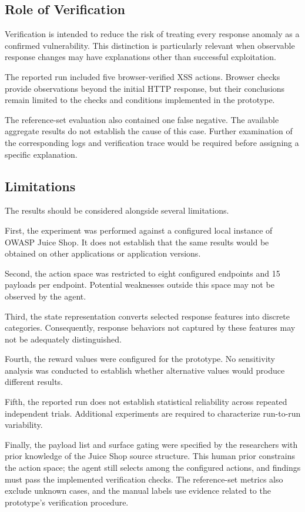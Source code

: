 \documentclass[conference]{IEEEtran}
\begin{document}
\subsection{Role of Verification}

Verification is intended to reduce the risk of treating
every response anomaly as a confirmed vulnerability.
This distinction is particularly relevant when observable
response changes may have explanations other than
successful exploitation.

The reported run included five browser-verified XSS
actions. Browser checks provide observations beyond the
initial HTTP response, but their conclusions remain
limited to the checks and conditions implemented in
the prototype.

The reference-set evaluation also contained one false
negative. The available aggregate results do not establish
the cause of this case. Further examination of the
corresponding logs and verification trace would be
required before assigning a specific explanation.

\subsection{Limitations}

The results should be considered alongside several
limitations.

First, the experiment was performed against a configured
local instance of OWASP Juice Shop. It does not establish
that the same results would be obtained on other
applications or application versions.

Second, the action space was restricted to eight
configured endpoints and 15 payloads per endpoint.
Potential weaknesses outside this space may not be
observed by the agent.

Third, the state representation converts selected response
features into discrete categories. Consequently, response
behaviors not captured by these features may not be
adequately distinguished.

Fourth, the reward values were configured for the
prototype. No sensitivity analysis was conducted to
establish whether alternative values would produce
different results.

Fifth, the reported run does not establish statistical
reliability across repeated independent trials.
Additional experiments are required to characterize
run-to-run variability.

Finally, the payload list and surface gating were specified
by the researchers with prior knowledge of the Juice Shop
source structure. This human prior constrains the action
space; the agent still selects among the configured actions,
and findings must pass the implemented verification checks.
The reference-set metrics also exclude unknown cases, and
the manual labels use evidence related to the prototype's
verification procedure.
\end{document}
